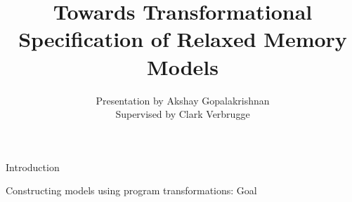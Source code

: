\documentclass[notes, xcolor = dvipsnames]{beamer}
\title{Towards Transformational Specification of Relaxed Memory Models}
\author{Presentation by Akshay Gopalakrishnan \\ Supervised by Clark Verbrugge}
\begin{document}
    
    \begin{frame}

        \maketitle

    \end{frame}

    \begin{frame}{Introduction}


    \end{frame}

    \begin{frame}{Constructing models using program transformations: Goal}


    \end{frame}
\end{document}
